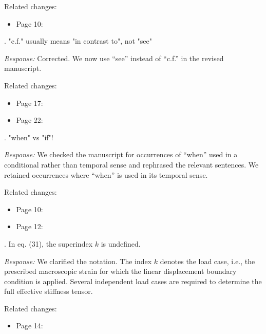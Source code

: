 \documentclass[pdflatex,sn-mathphys-num]{sn-jnl}
\begin{document}
Related changes:
\begin{itemize}
\item Page 10:  
\end{itemize}

\bigskip

. "c.f." usually means "in contrast to", not "see"

\emph{Response:} Corrected. We now use ``see'' instead of ``c.f.'' in the revised manuscript.

Related changes:
\begin{itemize}
\item Page 17:  
\item Page 22:  
\end{itemize}

\bigskip

. "when" vs "if"!

\emph{Response:} We checked the manuscript for occurrences of ``when'' used in a conditional rather than temporal sense and rephrased the relevant sentences. We retained occurrences where ``when'' is used in its temporal sense.

Related changes:
\begin{itemize}
\item Page 10:  
\item Page 12:  
\end{itemize}

\bigskip

. In eq. (31), the superindex $k$ is undefined.

\emph{Response:} We clarified the notation. The index $k$ denotes the load case, i.e., the prescribed macroscopic strain for which the linear displacement boundary condition is applied. Several independent load cases are required to determine the full effective stiffness tensor.

Related changes:
\begin{itemize}
\item Page 14: 
\end{itemize}
\end{document}
